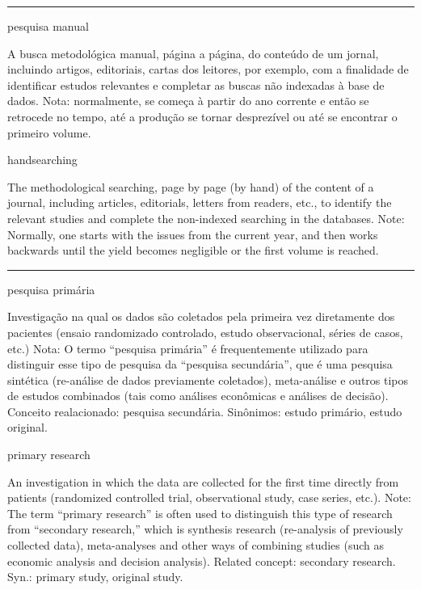 \documentclass[
]{book}
\begin{document}
\begin{center}\rule{0.5\linewidth}{0.5pt}\end{center}

pesquisa manual

A busca metodológica manual, página a página, do conteúdo de um jornal, incluindo artigos, editoriais, cartas dos leitores, por exemplo, com a finalidade de identificar estudos relevantes e completar as buscas não indexadas à base de dados. Nota: normalmente, se começa à partir do ano corrente e então se retrocede no tempo, até a produção se tornar desprezível ou até se encontrar o primeiro volume.

handsearching

The methodological searching, page by page (by hand) of the content of a journal, including articles, editorials, letters from readers, etc., to identify the relevant studies and complete the non-indexed searching in the databases. Note: Normally, one starts with the issues from the current year, and then works backwards until the yield becomes negligible or the first volume is reached.

\begin{center}\rule{0.5\linewidth}{0.5pt}\end{center}

pesquisa primária

Investigação na qual os dados são coletados pela primeira vez diretamente dos pacientes (ensaio randomizado controlado, estudo observacional, séries de casos, etc.) Nota: O termo ``pesquisa primária'' é frequentemente utilizado para distinguir esse tipo de pesquisa da ``pesquisa secundária'', que é uma pesquisa sintética (re-análise de dados previamente coletados), meta-análise e outros tipos de estudos combinados (tais como análises econômicas e análises de decisão). Conceito realacionado: pesquisa secundária. Sinônimos: estudo primário, estudo original.

primary research

An investigation in which the data are collected for the first time directly from patients (randomized controlled trial, observational study, case series, etc.). Note: The term ``primary research'' is often used to distinguish this type of research from ``secondary research,'' which is synthesis research (re-analysis of previously collected data), meta-analyses and other ways of combining studies (such as economic analysis and decision analysis). Related concept: secondary research. Syn.: primary study, original study.
\end{document}
